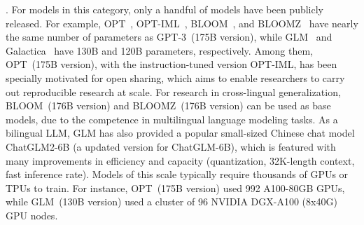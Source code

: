 {{. 
For models in this category, only a handful of models have been publicly released. For example, OPT~\cite{Zhang-arxiv-2022-OPT}, OPT-IML~\cite{Iyer-arxiv-2022-OPT}, BLOOM~\cite{Scao-arxiv-2022-BLOOM}, and BLOOMZ~\cite{Muennighoff-2022-arxiv-Crosslingual} have nearly the same number of parameters as GPT-3~(175B version), while GLM~\cite{Zeng-arxiv-2022-GLM} and Galactica~\cite{Taylor-arxiv-2022-Galactica} have 130B and 120B parameters, respectively. 
{Among them, OPT~(175B version), with the instruction-tuned version OPT-IML, has been specially motivated for open sharing, which aims to enable researchers to carry out reproducible research at scale. } 
For research in cross-lingual generalization, BLOOM~(176B version) and BLOOMZ~(176B version) can be used as base models,  due to the competence in multilingual language modeling tasks. 
As a bilingual LLM, GLM has also provided a popular small-sized Chinese chat model ChatGLM2-6B  
 (a updated version for ChatGLM-6B), which is featured with many improvements in efficiency and capacity (\eg quantization, 32K-length context, fast inference rate).   
Models of this scale typically require thousands of GPUs or TPUs to train. For instance, OPT~(175B version) used 992  A100-80GB GPUs, while GLM~(130B version) used  a cluster of 96 NVIDIA DGX-A100 (8x40G) GPU nodes.

}}
